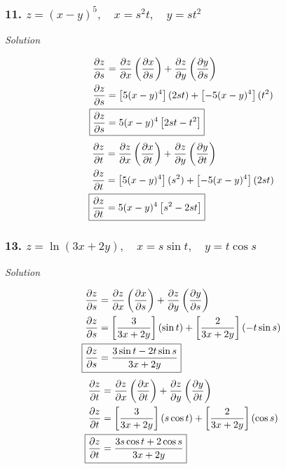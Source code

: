 \documentclass{article}
\newcommand{\solution}{\centerline{\textit{Solution}}}
\newcommand{\pp}[2]{\displaystyle\frac{\partial #1}{\partial #2}}
\newcommand{\bp}[1]{\left(#1\right)}
\newcommand{\bb}[1]{\left[#1\right]}
\begin{document}
\subsubsection*{11. $z=(x-y)^5,\quad x=s^2t,\quad y=st^2$}
\solution 
\begin{align*}
    \pp z s &= \pp z x \bp{\pp x s} + \pp z y\bp{\pp y s} \\
    \pp z s &= \bb{5(x-y)^4}(2st)+\bb{-5(x-y)^4}(t^2) \\
    \Aboxed{\pp z s &= 5(x-y)^4\bb{2st-t^2}}
\end{align*}
\begin{align*}
    \pp z t &= \pp z x \bp{\pp x t} + \pp z y \bp{\pp y t} \\
    \pp z t &= \bb{5(x-y)^4}(s^2)+\bb{-5(x-y)^4}(2st) \\
    \Aboxed{\pp z t &= 5(x-y)^4\bb{s^2-2st}}
\end{align*}
\subsubsection*{13. $z=\ln (3x+2y),\quad x=s\sin t,\quad y=t\cos s$}
\solution 
\begin{align*}
    \pp z s &= \pp z x \bp{\pp x s} + \pp z y\bp{\pp y s} \\
    \pp z s &= \bb{\displaystyle\frac{3}{3x+2y}}(\sin t) +
    \bb{\displaystyle\frac{2}{3x+2y}}(-t\sin s) \\
    \Aboxed{\pp z s &= \displaystyle\frac{3\sin t - 2t\sin s}{3x+2y}}
\end{align*}
\begin{align*}
    \pp z t &= \pp z x \bp{\pp x t} + \pp z y \bp{\pp y t} \\
    \pp z t &= \bb{\displaystyle\frac{3}{3x+2y}}(s\cos t) +
    \bb{\displaystyle\frac{2}{3x+2y}}(\cos s) \\
    \Aboxed{\pp z t &= \displaystyle\frac{3s\cos t + 2\cos s}{3x+2y}}
\end{align*}
\newpage
\end{document}
